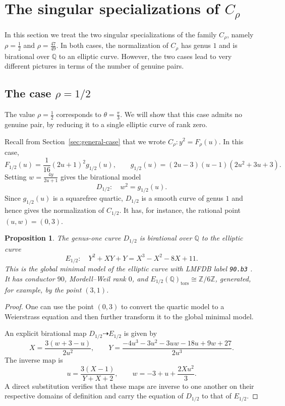 \documentclass[11pt]{amsart}
\theoremstyle{plain}
\newtheorem{prop}[thm]{Proposition}
\theoremstyle{remark}
\theoremstyle{plain}
\newcommand{\Q}{\mathbb{Q}}
\newcommand{\Z}{\mathbb{Z}}
\begin{document}
\section{The singular specializations of $C_\rho$} \label{sec:singular}

In this section we treat the two singular specializations of the family
$C_\rho$, namely $\rho=\frac12$ and $\rho=\frac{47}{49}$. In both cases,
the normalization of $C_\rho$ has genus $1$ and is birational over $\Q$
to an elliptic curve. However, the two cases lead to very different
pictures in terms of the number of genuine pairs.


\subsection{The case $\rho=1/2$}

The value $\rho=\frac12$ corresponds to $\theta=\frac{\pi}{3}$. We will show that this case admits no genuine
pair, by reducing it to a single elliptic curve of rank zero.

Recall from Section~\ref{sec:general-case} that we wrote $
C_{\rho}\colon y^{2}=F_{\rho}(u).$
In this case,
\begin{equation}\label{eq:F-half}
  F_{1/2}(u)=\frac{1}{16}(2u+1)^{2}g_{1/2}(u),
  \qquad
  g_{1/2}(u)=(2u-3)(u-1)(2u^{2}+3u+3).
\end{equation}
Setting $ w=\frac{4y}{2u+1}$
gives the birational model
\begin{equation}\label{eq:D}
D_{1/2}\colon\quad w^2=g_{1/2}(u).
\end{equation}
Since $g_{1/2}(u)$ is a squarefree quartic, $D_{1/2}$ is a smooth curve
of genus $1$ and hence gives the normalization of $C_{1/2}$.
 It has, for instance, the rational point $(u,w)=(0,3)$.

\begin{prop}\label{prop:E}
The genus-one curve $D_{1/2}$ is birational over $\Q$ to the elliptic curve
\[
E_{1/2}\colon\quad
Y^2+XY+Y=X^3-X^2-8X+11.
\]
This is the global minimal model of the elliptic curve with LMFDB label
\texttt{90.b3} \cite{lmfdb}. It has conductor $90$, Mordell--Weil rank $0$, and
$E_{1/2}(\Q)_{\mathrm{tors}}\cong \Z/6\Z$,
generated, for example, by the point $(3,1)$.
\end{prop}

\begin{proof}
One can use the point $(0,3)$ to convert the quartic model to a
Weierstrass equation and then further transform it to the global minimal
model.

An explicit birational map $D_{1/2}\dashrightarrow E_{1/2}$ is given by
\[
X=\frac{3(w+3-u)}{2u^2},
\qquad
Y=
\frac{-4u^3-3u^2-3uw-18u+9w+27}{2u^3}.
\]
The inverse map is
\[
u=\frac{3(X-1)}{Y+X+2},
\qquad
w=-3+u+\frac{2Xu^2}{3}.
\]
A direct substitution verifies that these maps are inverse to one another
on their respective domains of definition and carry the equation of $D_{1/2}$
to that of $E_{1/2}$.
\end{proof}
\end{document}
